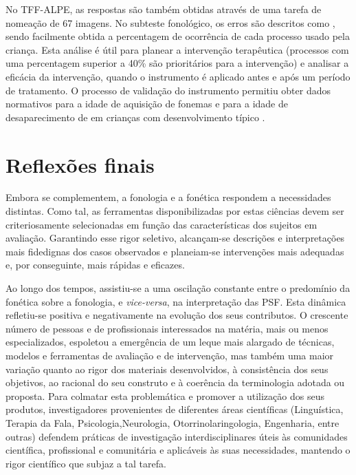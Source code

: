 \documentclass[output=paper]{LSP/langsci}
\begin{document}
No TFF-ALPE, as respostas são também obtidas através de uma tarefa de nomeação de 67 imagens. No subteste fonológico, os erros são descritos como , sendo facilmente obtida a percentagem de ocorrência de cada processo usado pela criança. Esta análise é útil para planear a intervenção terapêutica (processos com uma percentagem superior a 40\% são prioritários para a intervenção) e analisar a eficácia da intervenção, quando o instrumento é aplicado antes e após um período de tratamento. O processo de validação do instrumento permitiu obter dados normativos para a idade de aquisição de fonemas e para a idade de desaparecimento de  em crianças com desenvolvimento típico \citep{lousada_etal2012,mendes_etal2013}. 

\section{Reflexões finais}
\label{sec:lousada_conclusao}

Embora se complementem, a fonologia e a fonética respondem a necessidades distintas. Como tal, as ferramentas disponibilizadas por estas ciências devem ser criteriosamente selecionadas em função das características dos sujeitos em avaliação. Garantindo esse rigor seletivo, alcançam-se descrições e interpretações mais fidedignas dos casos observados e planeiam-se intervenções mais adequadas e, por conseguinte, mais rápidas e eficazes.

Ao longo dos tempos, assistiu-se a uma oscilação constante entre o predomínio da fonética sobre a fonologia, e \textit{vice-versa}, na interpretação das PSF. Esta dinâmica refletiu-se positiva e negativamente na evolução dos seus contributos. O crescente número de pessoas e de profissionais interessados na matéria, mais ou menos especializados, espoletou a emergência de um leque mais alargado de técnicas, modelos e ferramentas de avaliação e de intervenção, mas também uma maior variação quanto ao rigor dos materiais desenvolvidos, à consistência dos seus objetivos, ao racional do seu construto e à coerência da terminologia adotada ou proposta. Para colmatar esta problemática e promover a utilização dos seus produtos, investigadores provenientes de diferentes áreas científicas (Linguística, Terapia da Fala, Psicologia,\largerpage Neurologia, Otorrinolaringologia, Engenharia, entre outras) defendem práticas de investigação interdisciplinares úteis às comunidades científica, profissional e comunitária e aplicáveis às suas necessidades, mantendo o rigor científico que subjaz a tal tarefa. 





{\sloppy
\printbibliography[heading=subbibliography,notkeyword=this]
}
\end{document}
